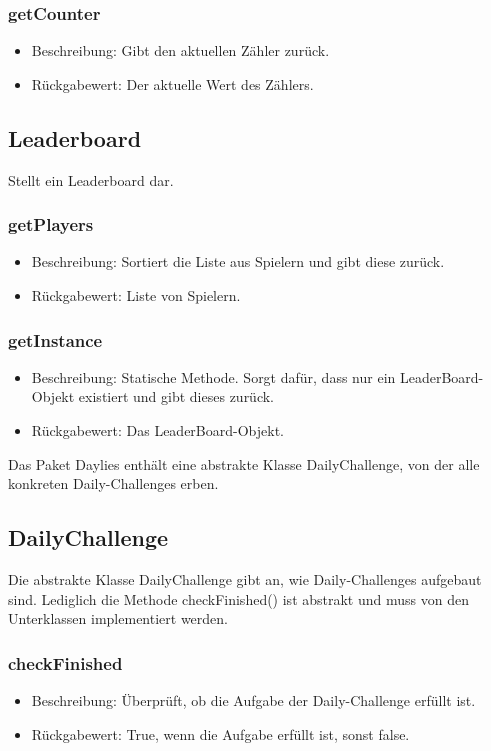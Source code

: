\documentclass[a4paper]{scrreprt}
\begin{document}
   \subsubsection{getCounter}
   \begin{itemize}
   	\item Beschreibung: Gibt den aktuellen Zähler zurück.
   	\item Rückgabewert: Der aktuelle Wert des Zählers.
   \end{itemize}
   
   
   \subsection{Leaderboard}
   Stellt ein Leaderboard dar.
   
   \subsubsection{getPlayers}
   \begin{itemize}
   	\item Beschreibung: Sortiert die Liste aus Spielern und gibt diese zurück.
   	\item Rückgabewert: Liste von Spielern.
   \end{itemize}
   \subsubsection{getInstance}
   \begin{itemize}
   	\item Beschreibung: Statische Methode. Sorgt dafür, dass nur ein LeaderBoard-Objekt existiert und gibt dieses zurück.
   	\item Rückgabewert: Das LeaderBoard-Objekt.
   \end{itemize}
   
   Das Paket Daylies enthält eine abstrakte Klasse DailyChallenge, von der alle konkreten Daily-Challenges erben.
   
   \subsection{DailyChallenge}
   Die abstrakte Klasse DailyChallenge gibt an, wie Daily-Challenges aufgebaut sind. Lediglich die Methode checkFinished() ist abstrakt und muss von den Unterklassen implementiert werden.
   \subsubsection{checkFinished}
   \begin{itemize}
     \item Beschreibung: Überprüft, ob die Aufgabe der Daily-Challenge erfüllt ist.
     \item Rückgabewert: True, wenn die Aufgabe erfüllt ist, sonst false.
    \end{itemize}
\end{document}
